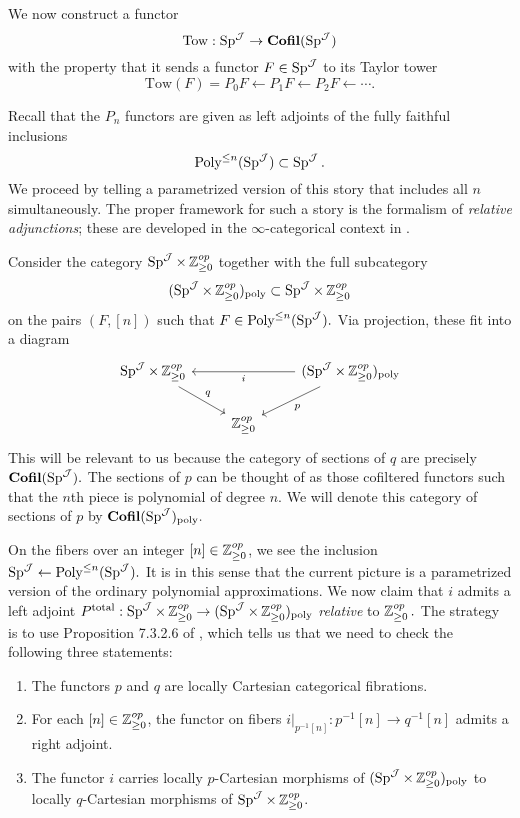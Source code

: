 
\begin{cnstr}\label{cnstr:tower}
We now construct a functor $$\mathrm{Tow}: \operatorname{\mathrm{Sp}}^{\operatorname{\mathcal{J}}} \to \operatorname{\mathbf{Cofil}}(\operatorname{\mathrm{Sp}}^{\operatorname{\mathcal{J}}})$$ with the property that it sends a functor $F\in \operatorname{\mathrm{Sp}}^{\operatorname{\mathcal{J}}}$ to its Taylor tower $$\mathrm{Tow}(F) = P_0F \longleftarrow P_1F \longleftarrow P_2F \longleftarrow \cdots.$$


Recall that the $P_n$ functors are given as left adjoints of the fully faithful inclusions $$\operatorname{\text{Poly}}^{\leq n}(\operatorname{\mathrm{Sp}}^{\operatorname{\mathcal{J}}}) \subset \operatorname{\mathrm{Sp}}^{\operatorname{\mathcal{J}}}.$$  We proceed by telling a parametrized version of this story that includes all $n$ simultaneously.  The proper framework for such a story is the formalism of \emph{relative adjunctions}; these are developed in the $\infty$-categorical context in \cite[Section 7.3.2]{HA}.  

Consider the category $\operatorname{\mathrm{Sp}}^{\operatorname{\mathcal{J}}}\times \operatorname{\mathbb{Z}}^{op}_{\geq 0}$ together with the full subcategory $$(\operatorname{\mathrm{Sp}}^{\operatorname{\mathcal{J}}}\times \operatorname{\mathbb{Z}}^{op}_{\geq 0})_{\text{poly}} \subset \operatorname{\mathrm{Sp}}^{\operatorname{\mathcal{J}}}\times \operatorname{\mathbb{Z}}^{op}_{\geq 0}$$ on the pairs $(F, [n])$ such that $F\in \operatorname{\text{Poly}}^{\leq n}(\operatorname{\mathrm{Sp}}^{\operatorname{\mathcal{J}}}).$  Via projection, these fit into a diagram
$$
\begin{tikzcd}\label{dia:reladj}
\Sp^{\J}\times \Z^{op}_{\geq 0} \arrow[rd,"q"]& &(\Sp^{\J}\times \Z^{op}_{\geq 0})_{\text{poly}} \arrow[ld,"p"]\arrow[ll,"i"]  \\
& \Z^{op}_{\geq 0}
\end{tikzcd}
$$
 This will be relevant to us because the category of sections of $q$ are precisely $\operatorname{\mathbf{Cofil}}(\operatorname{\mathrm{Sp}}^{\operatorname{\mathcal{J}}}).$  The sections of $p$ can be thought of as those cofiltered functors such that the $n$th piece is polynomial of degree $n$.  We will denote this category of sections of $p$ by $\operatorname{\mathbf{Cofil}}(\operatorname{\mathrm{Sp}}^{\operatorname{\mathcal{J}}})_{\text{poly}}.$ 

On the fibers over an integer $[n] \in \operatorname{\mathbb{Z}}^{op}_{\geq 0}$, we see the inclusion $\operatorname{\mathrm{Sp}}^{\operatorname{\mathcal{J}}} \leftarrow \operatorname{\text{Poly}}^{\leq n}(\operatorname{\mathrm{Sp}}^{\operatorname{\mathcal{J}}}).$  It is in this sense that the current picture is a parametrized version of the ordinary polynomial approximations.  We now claim that $i$ admits a left adjoint $P^{\text{total}}: \operatorname{\mathrm{Sp}}^{\operatorname{\mathcal{J}}}\times \operatorname{\mathbb{Z}}^{op}_{\geq 0} \to (\operatorname{\mathrm{Sp}}^{\operatorname{\mathcal{J}}}\times \operatorname{\mathbb{Z}}^{op}_{\geq 0})_{\text{poly}}$ \emph{relative} to $\operatorname{\mathbb{Z}}^{op}_{\geq 0}.$    The strategy is to use Proposition 7.3.2.6 of \cite{HA}, which tells us that we need to check the following three statements:
\begin{enumerate}
\item The functors $p$ and $q$ are locally Cartesian categorical fibrations.
\item For each $[n]\in \operatorname{\mathbb{Z}}^{op}_{\geq 0}$, the functor on fibers $i|_{p^{-1}[n]}:p^{-1}[n] \to q^{-1}[n]$ admits a right adjoint.  
\item The functor $i$ carries locally $p$-Cartesian morphisms of $(\operatorname{\mathrm{Sp}}^{\operatorname{\mathcal{J}}}\times \operatorname{\mathbb{Z}}^{op}_{\geq 0})_{\text{poly}}$ to locally $q$-Cartesian morphisms of $\operatorname{\mathrm{Sp}}^{\operatorname{\mathcal{J}}}\times \operatorname{\mathbb{Z}}^{op}_{\geq 0}$.
\end{enumerate}


\end{cnstr}
